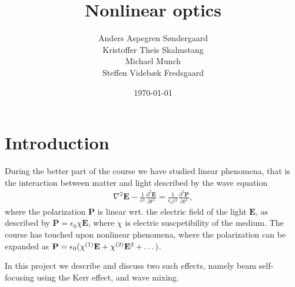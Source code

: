\documentclass[a4paper,oneside,article]{memoir}
\newcommand\ppdiff[3][\partial]{\frac{#1^2 #2}{#1 #3^2}}
\newcommand{\order}[1]{^{\textup{(#1)}}} %
\begin{document}
\author{
  Anders Aspegren Søndergaard \\
  Kristoffer Theis Skalmstang \\
  Michael Munch \\
  Steffen Videbæk Fredsgaard \\
}
\title{Nonlinear optics}\date{\today}
\maketitle

\tableofcontents

\chapter{Introduction}
\label{cha:intro}

During the better part of the course we have studied linear phenomena,
that is the interaction between matter and light described by the wave
equation
\begin{align}
  \label{eq:wave-general}
  \nabla^2 \mathbf E - \frac{1}{c^2} \ppdiff{\mathbf E}{t}
  = \frac{1}{\epsilon_0c^2} \ppdiff{\mathbf P}{t},
\end{align}
where the polarization $\mathbf P$ is linear wrt. the electric field
of the light $\mathbf E$, as described by $\mathbf P = \epsilon_0 \chi
\mathbf E$, where $\chi$ is electric suscpetibility of the medium. The
course has touched upon nonlinear phenomena, where the polarization
can be expanded as $\mathbf P = \epsilon_0 ( \chi\order1 \mathbf E +
\chi\order2 \mathbf E^2 + \dots )$.

In this project we describe and discuss two such effects, namely beam
self-focusing using the Kerr effect, and wave mixing.










\nocite{*}
\printbibliography
\end{document}

